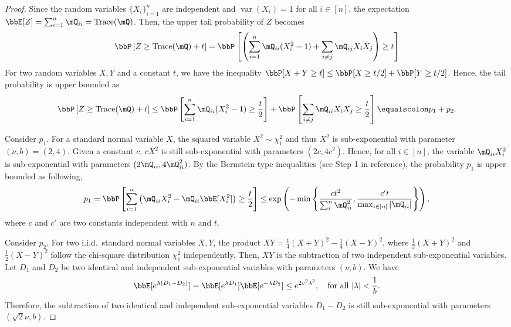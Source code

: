 \documentclass[11pt]{article}
\DeclareMathOperator{\var}{var}
\DeclareMathOperator{\tr}{Trace}
\newcommand{\of}[1]{\left(#1\right)}
\newcommand{\off}[1]{\left[#1\right]}
\newcommand{\offf}[1]{\left\{#1\right\}}
\theoremstyle{plain}
\theoremstyle{definition}
\begin{document}
    \begin{proof}
    	Since the random variables $\{X_i\}_{i=1}^n$ are independent and $\var(X_i) = 1$ for all $i \in [n]$, the expectation $\bbE[Z] = \sum_{i = 1}^{n} \mQ_{ii} = \tr(\mQ)$. Then, the upper tail probability of $Z$ becomes
    	\begin{equation}
    		\bbP \off{ Z \geq \tr(\mQ) +  t } = \bbP \off{ \of{  \sum_{i = 1}^{n} \mQ_{ii} (X^2_i - 1) + \sum_{i \neq j} \mQ_{ij} X_i X_j }\geq t   }
    	\end{equation}
    	For two random variables $X,Y$ and a constant $t$, we have the inequality $ \bbP[X+Y \geq t] \leq \bbP[X \geq t/2] + \bbP[Y \geq t/2]$. Hence, the tail probability is upper bounded as
    	\begin{equation}
    		\bbP \off{ Z \geq \tr(\mQ) +  t } \leq \bbP\off{ \sum_{i =1 }^n \mQ_{ii}(X_i^2 - 1) \geq \frac{t}{2}  } + \bbP \off{ \sum_{i \neq j} \mQ_{ii} X_i X_j  \geq \frac{t}{2}} \equalscolon p_1 + p_2.
    	\end{equation} 
    	
    	Consider $p_1$. For a standard normal variable $X$,  the squared variable $X^2 \sim \chi^2_1$ and thus $X^2$ is sub-exponential with parameter $(\nu, b) = (2,4)$. Given a constant $c$, $cX^2$ is still sub-exponential with parameters $(2 c, 4 c^2)$. Hence, for all $i \in [n]$, the variable $\mQ_{ii} X_i^2$ is sub-exponential with parameters $(2 \mQ_{ii}, 4 \mQ^2_{ii} )$. By the Bernstein-type inequalities (see Step 1 in reference), the probability $p_1$ is upper bounded as following,
    	\begin{equation}
    		p_1 = \bbP \off{\sum_{i=1}^n { \of{ \mQ_{ii}X^2_i - \mQ_{ii}\bbE[X^2_i]   } \geq \frac{t}{2} }} \leq \exp \of{ - \min \offf{  \frac{c t^2}{\sum_{i}^n \mQ^2_{ii} }, \frac{c't}{\max_{i \in [n]  }|\mQ_{ii}| } }},
    	\end{equation}
    	where $c$ and $c'$ are two constants independent with $n$ and $t$.
    	
    	\vspace{0.2cm}
    	
    	Consider $p_2$. For two i.i.d.\ standard normal variables $X,Y$, the product $XY = \frac{1}{4}(X+Y)^2 - \frac{1}{4}(X-Y )^2$, where $ \frac{1}{2} (X+Y)^2$ and $\frac{1}{2} (X-Y)^2$ follow the chi-square distribution $\chi^2_1$ independently. Then, $XY$ is the subtraction of two independent sub-exponential variables. Let $D_1$ and $D_2$ be two identical and independent sub-exponential variables with parameters $(\nu, b)$. We have
    	\[ \bbE[e^{\lambda (D_1-D_2)}] = \bbE[e^{\lambda D_1}] \bbE[e^{-\lambda D_2}] \leq e^{2v^2 \lambda^2}, \quad \text{for all } |\lambda | < \frac{1}{b}.  \]
    	Therefore, the subtraction of two identical and independent sub-exponential variables $D_1 -D_2$ is still sub-exponential with parameters $(\sqrt{2}\nu, b)$.
    	

\end{proof}
\end{document}
